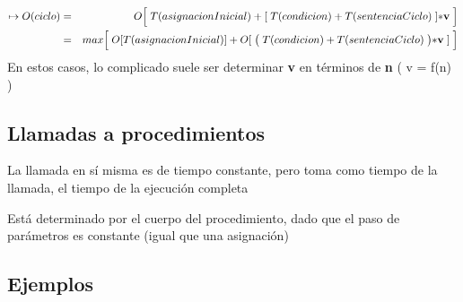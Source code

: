 \begin{eqnarray*}
  \mapsto O(ciclo) &=& O \Bigl[\; T (  asignacionInicial ) +   [ \;T ( condicion ) + T ( sentenciaCiclo ) \;] {\bf * v} \;\Bigr]\\
  &=& max \Bigl[ \;O [ T (asignacionInicial )] +  O [\; \bigl( \; T ( condicion ) + T ( sentenciaCiclo ) \;\bigr) {\bf * v} \;]\;\Bigr]
\end{eqnarray*}
En estos casos, lo complicado suele ser determinar \textbf{v} en
términos de \textbf{n} ( v = f(n) )

\subsection{Llamadas a procedimientos}
\label{sec:llam-proc}

La llamada en sí misma es de tiempo constante, pero toma como tiempo
de la llamada, el tiempo de la ejecución completa

Está determinado por el cuerpo del procedimiento, dado que el paso de
parámetros es constante (igual que una asignación)

\subsection{Ejemplos}
\label{sec:ejemplos}

